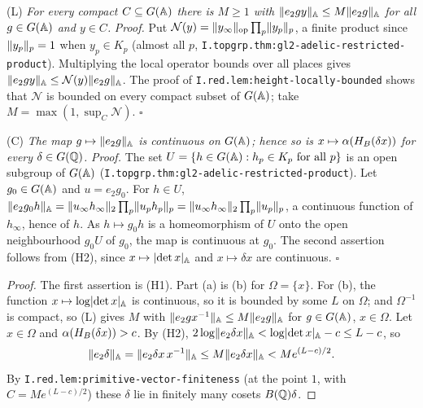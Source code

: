 \label{fact:trunc-local-bound}(L) \emph{For every compact $C\subseteq G(\mathbb{A})$ there is $M\ge1$ with $\lVert e_2gy\rVert_{\mathbb{A}}\le M\lVert e_2g\rVert_{\mathbb{A}}$ for all
$g\in G(\mathbb{A})$ and $y\in C$.} \emph{Proof.} Put $\mathcal N(y)=\lVert y_\infty\rVert_{\mathrm{op}}\prod_p\lVert y_p\rVert_p$, a finite product since $\lVert y_p\rVert_p=1$ when
$y_p\in K_p$ (almost all $p$, \texttt{I.topgrp.thm:gl2-adelic-restricted-product}). Multiplying the local operator bounds over all places gives
$\lVert e_2gy\rVert_{\mathbb{A}}\le\mathcal N(y)\lVert e_2g\rVert_{\mathbb{A}}$. The proof of \texttt{I.red.lem:height-locally-bounded} shows that $\mathcal N$ is bounded on every
compact subset of $G(\mathbb{A})$; take $M=\max(1,\sup_C\mathcal N)$. $\square$

\label{fact:trunc-norm-continuous}(C) \emph{The map $g\mapsto\lVert e_2g\rVert_{\mathbb{A}}$ is continuous on $G(\mathbb{A})$; hence so is
$x\mapsto\alpha(H_B(\delta x))$ for every $\delta\in G(\mathbb{Q})$.} \emph{Proof.} The set $U=\{h\in G(\mathbb{A}):h_p\in K_p\text{ for all }p\}$ is an open
subgroup of $G(\mathbb{A})$ (\texttt{I.topgrp.thm:gl2-adelic-restricted-product}). Let $g_0\in G(\mathbb{A})$ and $u=e_2g_0$. For $h\in U$,
$\lVert e_2g_0h\rVert_{\mathbb{A}}=\lVert u_\infty h_\infty\rVert_2\prod_p\lVert u_ph_p\rVert_p=\lVert u_\infty h_\infty\rVert_2\prod_p\lVert u_p\rVert_p$, a continuous function of
$h_\infty$, hence of $h$. As $h\mapsto g_0h$ is a homeomorphism of $U$ onto the open neighbourhood $g_0U$ of $g_0$, the map is continuous at $g_0$. The
second assertion follows from (H2), since $x\mapsto\lvert\det x\rvert_{\mathbb{A}}$ and $x\mapsto\delta x$ are continuous. $\square$

\begin{theorem}
\end{theorem}
\begin{proof}
The first assertion is (H1). Part (a) is (b) for $\Omega=\{x\}$. For (b), the function $x\mapsto\log\lvert\det x\rvert_{\mathbb{A}}$ is continuous, so it is bounded
by some $L$ on $\Omega$; and $\Omega^{-1}$ is compact, so (L) gives $M$ with $\lVert e_2gx^{-1}\rVert_{\mathbb{A}}\le M\lVert e_2g\rVert_{\mathbb{A}}$ for $g\in G(\mathbb{A})$, $x\in\Omega$. Let
$x\in\Omega$ and $\alpha(H_B(\delta x))>c$. By (H2), $2\log\lVert e_2\delta x\rVert_{\mathbb{A}}<\log\lvert\det x\rvert_{\mathbb{A}}-c\le L-c$, so
\[
  \lVert e_2\delta\rVert_{\mathbb{A}}=\lVert e_2\delta x\,x^{-1}\rVert_{\mathbb{A}}\le M\lVert e_2\delta x\rVert_{\mathbb{A}}<Me^{(L-c)/2}.
\]
By \texttt{I.red.lem:primitive-vector-finiteness} (at the point $1$, with $C=Me^{(L-c)/2}$) these $\delta$ lie in finitely many cosets $B(\mathbb{Q})\delta$.
\end{proof}

